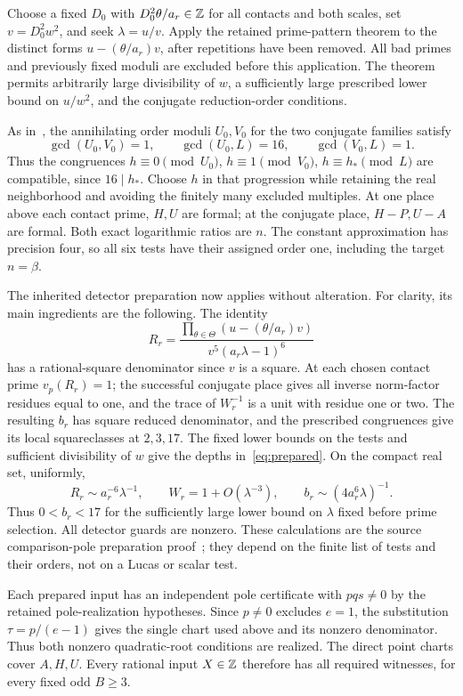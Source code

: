 \documentclass[11pt,a4paper]{article}
\begin{document}
Choose a fixed $D_0$ with $D_0^2\theta/a_r\in\mathbb Z$ for all
contacts and both scales, set $v=D_0^2w^2$, and seek
$\lambda=u/v$. Apply the retained prime-pattern theorem to
the distinct forms $u-(\theta/a_r)v$, after repetitions have
been removed. All bad primes and previously fixed moduli are
excluded before this application. The theorem permits arbitrarily
large divisibility of $w$, a sufficiently large prescribed lower
bound on $u/w^2$, and the conjugate reduction-order conditions.

As in~\cite{Dependencies,Baseline}, the annihilating order moduli
$U_0,V_0$ for the two conjugate families satisfy
\[
 \gcd(U_0,V_0)=1,\qquad \gcd(U_0,L)=16,\qquad\gcd(V_0,L)=1.
\]
Thus the congruences
$h\equiv0\pmod{U_0}$, $h\equiv1\pmod{V_0}$,
$h\equiv h_*\pmod L$ are compatible, since $16\mid h_*$.
Choose $h$ in that
progression while retaining the real neighborhood and avoiding
the finitely many excluded multiples. At one place above each
contact prime, $H,U$ are formal; at the conjugate place,
$H-P,U-A$ are formal. Both exact logarithmic ratios are $n$.
The constant approximation has precision four, so all six tests
have their assigned order one, including the target $n=\beta$.

The inherited detector preparation now applies without alteration.
For clarity, its main ingredients are the following. The identity
\[
 R_r=\frac{\prod_{\theta\in\Theta}(u-(\theta/a_r)v)}
                  {v^5(a_r\lambda-1)^6}
\]
has a rational-square denominator since $v$ is a square.
At each chosen contact prime $v_p(R_r)=1$; the successful
conjugate place gives all inverse norm-factor residues equal to
one, and the trace of $W_r^{-1}$ is a unit with residue one or two.
The resulting $b_r$ has square reduced denominator, and the
prescribed congruences give its local squareclasses at $2,3,17$.
The fixed lower bounds on the tests and sufficient divisibility
of $w$ give the depths in~\eqref{eq:prepared}.
On the compact real set, uniformly,
\[
 R_r\sim a_r^{-6}\lambda^{-1},\qquad
 W_r=1+O(\lambda^{-3}),\qquad
 b_r\sim(4a_r^6\lambda)^{-1}.
\]
Thus $0<b_r<17$ for the sufficiently large lower bound on
$\lambda$ fixed before prime selection. All detector guards
are nonzero. These calculations are the source comparison-pole
preparation proof~\cite{Baseline}; they depend on the finite
list of tests and their orders, not on a Lucas or scalar test.

Each prepared input has an independent pole certificate with
$pqs\ne0$ by the retained pole-realization hypotheses.
Since $p\ne0$ excludes $e=1$, the substitution
$\tau=p/(e-1)$ gives the single chart used above and its
nonzero denominator. Thus both nonzero quadratic-root conditions
are realized. The direct point charts cover $A,H,U$.
Every rational input $X\in\mathbb Z$ therefore has all required
witnesses, for every fixed odd $B\ge3$.
\end{document}

